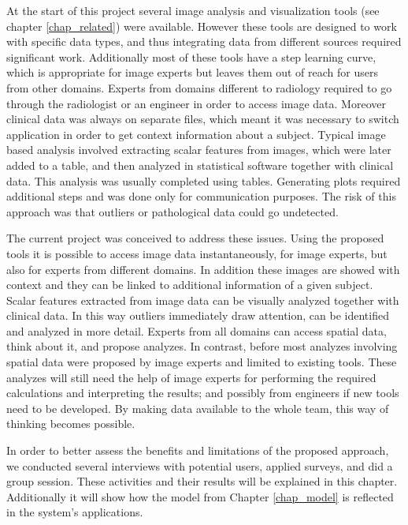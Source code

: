 

At the start of this project several image analysis and visualization tools (see chapter \ref{chap_related}) were available. However these tools are designed to work with specific data types, and thus integrating data from different sources required significant work. Additionally most of these tools have a step learning curve, which is appropriate for image experts but leaves them out of reach for users from other domains. Experts from domains different to radiology required to go through the radiologist or an engineer in order to access image data. Moreover clinical data was always on separate files, which meant it was necessary to switch application in order to get context information about a subject. Typical image based analysis involved extracting scalar features from images, which were later added to a table, and then analyzed in statistical software together with clinical data. This analysis was usually completed using tables. Generating plots required additional steps and was done only for communication purposes. The risk of this approach was that outliers or pathological data could go undetected. 

The current project was conceived to address these issues. Using the proposed tools it is possible to access image data instantaneously,  for image experts, but also for experts from different domains. In addition these images are showed with context and they can be linked to additional information of a given subject. Scalar features extracted from image data can be visually analyzed together with clinical data. In this way outliers immediately draw attention, can be identified and analyzed in more detail. Experts from all domains can access spatial data, think about it, and propose analyzes. In contrast, before most analyzes involving spatial data were proposed by image experts and limited to existing tools. These analyzes will still need the help of image experts for performing the required calculations and interpreting the results; and possibly from engineers if new tools need to be developed. By making data available to the whole team, this way of thinking becomes possible.    

In order to better assess the benefits and limitations of the proposed approach, we conducted several interviews with potential users, applied surveys, and did a group session. These activities and their results will be explained in this chapter. Additionally it will show how the model from Chapter \ref{chap_model} is reflected in the system's applications.	

